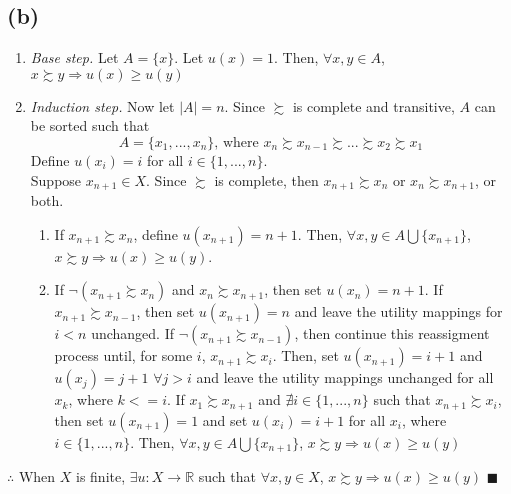 \documentclass{article}
\newcommand{\R}{\mathbb{R}}
\newcommand{\union}{\bigcup}
\begin{document}
\subsection*{(b)}
\begin{enumerate}
	\item \textit{Base step.} Let $A=\{x\}$. Let $u(x) = 1$. Then, $\forall x,y\in A$, ${x\succsim y\Rightarrow u(x)\geq u(y)}$
	
	\item \textit{Induction step.}  Now let $|A|=n$. Since $\succsim$ is complete and transitive, $A$ can be sorted such that
		\[
			A=\{x_1,...,x_n\}\text{, where } x_n\succsim x_{n-1} \succsim ... \succsim x_2\succsim x_1
		\]
		Define $u(x_i)=i$ for all $i\in\{1,...,n\}$. 
		\medskip \\
		Suppose $x_{n+1}\in X$. Since $\succsim$ is complete, then $x_{n+1}\succsim x_n$ or $x_n\succsim x_{n+1}$, or both.
		\begin{enumerate}
			\item If $x_{n+1}\succsim x_n$, define $u(x_{n+1})=n+1$. Then, $\forall x,y\in A\union\{x_{n+1}\}$, $x\succsim y\Rightarrow u(x)\geq u(y)$.
			\item If ${\neg(x_{n+1}\succsim x_n)}$ and ${x_n\succsim x_{n+1}}$, then set $u(x_n)=n+1$. If ${x_{n+1}\succsim x_{n-1}}$, then set ${u(x_{n+1})=n}$ and leave the utility mappings for $i<n$ unchanged. If ${\neg(x_{n+1}\succsim x_{n-1})}$, then continue this reassigment process until, for some ${i}$, ${x_{n+1}\succsim x_i}$. Then, set ${u(x_{n+1})=i+1}$ and ${u(x_j)=j+1}$ ${\forall j>i}$ and leave the utility mappings unchanged for all ${x_k}$, where ${k<=i}$. If ${x_1\succsim x_{n+1}}$ and ${\nexists i\in\{1,...,n\}}$ such that ${x_{n+1}\succsim x_i}$, then set ${u(x_{n+1}) = 1}$ and set ${u(x_i)=i+1}$ for all $x_i$, where ${i\in\{1,...,n\}}$. Then, ${\forall x,y\in A\union\{x_{n+1}\}}$, ${x\succsim y\Rightarrow u(x)\geq u(y)}$
		\end{enumerate}
	
\end{enumerate}
$\therefore$ When $X$ is finite, $\exists u:X\rightarrow\R$ such that $\forall x,y\in X$, $x\succsim y\Rightarrow u(x)\geq u(y)$ $\blacksquare$


\end{document}
